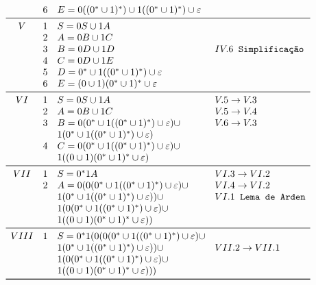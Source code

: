 \documentclass[12pt]{article}
\begin{document}
\begin{tcolorbox}[breakable,rounded corners, colback=yellow!5, colframe=red!40!black, title={Extração de expressão regular $\mathcal{R}_1$ da gramática $G$, tal que $\mathcal{L}(\mathcal{R}_1)=\mathcal{L}(G_1)$}]
$$\begin{array}{ccll}
      & 6 & E = 0((0^*\cup1)^*)\cup1((0^*\cup1)^*)\cup\varepsilon   &\\
  \midrule
    V & 1 & S = 0S \cup 1A           &\\
      & 2 & A = 0B \cup 1C           &\\
      & 3 & B = 0D \cup 1D           &IV.6\texttt{ Simplificação}\\
      & 4 & C = 0D \cup 1E           &\\
      & 5 & D = 0^*\cup1((0^*\cup1)^*)\cup\varepsilon          &\\
      & 6 & E = (0\cup1)(0^*\cup1)^*\cup\varepsilon   &\\
  \midrule
    VI & 1 & S = 0S \cup 1A           &V.5\to V.3\\
      & 2 & A = 0B \cup 1C           &V.5\to V.4\\
      & 3 & B = 0(0^*\cup1((0^*\cup1)^*)\cup\varepsilon) \cup &V.6\to V.3\\
      &  &1(0^*\cup1((0^*\cup1)^*)\cup\varepsilon)           &\\
      & 4 & C = 0(0^*\cup1((0^*\cup1)^*)\cup\varepsilon) \cup &\\
      & &1((0\cup1)(0^*\cup1)^*\cup\varepsilon)           &\\
  \midrule
  VII & 1 & S = 0^*1A           &VI.3 \to VI.2\\
      & 2 & A = 0(0(0^*\cup1((0^*\cup1)^*)\cup\varepsilon) \cup &VI.4 \to VI.2\\
      &  &1(0^*\cup1((0^*\cup1)^*)\cup\varepsilon)) \cup &VI.1\texttt{ Lema de Arden}\\
      & &1(0(0^*\cup1((0^*\cup1)^*)\cup\varepsilon) \cup &\\
      & &1((0\cup1)(0^*\cup1)^*\cup\varepsilon))           &\\
  \midrule
   VIII & 1 & S = 0^*1(0(0(0^*\cup1((0^*\cup1)^*)\cup\varepsilon) \cup &\\
      &  &1(0^*\cup1((0^*\cup1)^*)\cup\varepsilon)) \cup &VII.2\to VII.1\\
      & &1(0(0^*\cup1((0^*\cup1)^*)\cup\varepsilon) \cup &\\
      & &1((0\cup1)(0^*\cup1)^*\cup\varepsilon))) &\\
  \bottomrule
  \end{array}
  $$
\end{tcolorbox}\bigskip
\end{document}
